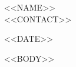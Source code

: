 \documentclass[letterpaper,11pt]{article}
\begin{document}
\begin{center}
    {\Huge\scshape <<NAME>>} \\ \vspace{1mm}
    {<<CONTACT>>}
\end{center}
\vspace{10pt}
<<DATE>>

<<BODY>>
\end{document}
